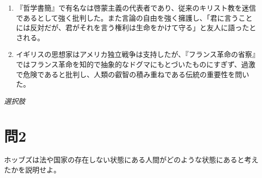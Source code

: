 \documentclass[uplatex,dvipdfmx]{jsarticle}
\begin{document}
\begin{enumerate}
 \item 『哲学書簡』で有名な\anaume{}は啓蒙主義の代表者であり、従来のキリスト教を迷信であるとして強く批判した。また言論の自由を強く擁護し、「君に言うことには反対だが、君がそれを言う権利は生命をかけて守る」と友人に語ったとされる。

 \item イギリスの思想家\anaume{}はアメリカ独立戦争は支持したが、『フランス革命の省察』ではフランス革命を知的で抽象的なドグマにもとづいたものにすぎず、過激で危険であると批判し、人類の叡智の積み重ねである伝統の重要性を問いた。

\end{enumerate}

\begin{flushleft}
\emph{選択肢}
\end{flushleft}
\setcounter{anumber}{1}

\section*{問2}

ホッブズは法や国家の存在しない状態にある人間がどのような状態にあると考えたかを説明せよ。
\end{document}
